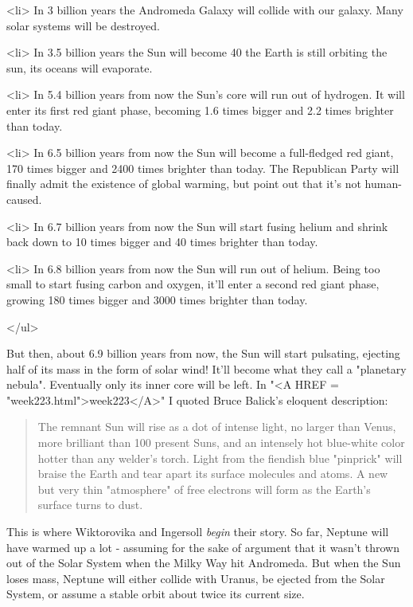 <li>
In 3 billion years the Andromeda Galaxy will collide with our galaxy.
Many solar systems will be destroyed.  

<li>
In 3.5 billion years the Sun will become 40%
the Earth is still orbiting the sun, its oceans will evaporate.

<li>
In 5.4 billion years from now the Sun's core will run out of hydrogen.
It will enter its first red giant phase, becoming 1.6 times bigger and 
2.2 times brighter than today.

<li>
In 6.5 billion years from now the Sun will become a full-fledged red 
giant, 170 times bigger and 2400 times brighter than today.  The 
Republican Party will finally admit the existence of global warming, 
but point out that it's not human-caused.

<li>
In 6.7 billion years from now the Sun will start fusing helium and 
shrink back down to 10 times bigger and 40 times brighter than today.

<li>
In 6.8 billion years from now the Sun will run out of helium.  Being
too small to start fusing carbon and oxygen, it'll enter a second red 
giant phase, growing 180 times bigger and 3000 times brighter than today. 

</ul>

But then, about 6.9 billion years from now, the Sun will start pulsating, 
ejecting half of its mass in the form of solar wind!  It'll become what
they call a "planetary nebula".  Eventually only its inner core will be 
left.  In "<A HREF = "week223.html">week223</A>" I quoted Bruce Balick's eloquent description: 

\begin{quote}
     The remnant Sun will rise as a dot of intense light, no larger
     than Venus, more brilliant than 100 present Suns, and an
     intensely hot blue-white color hotter than any welder's torch.
     Light from the fiendish blue "pinprick" will braise the
     Earth and tear apart its surface molecules and atoms.  A new but
     very thin "atmosphere" of free electrons will form as
     the Earth's surface turns to dust.  
\end{quote}

This is where Wiktorovika and Ingersoll \emph{begin} their story.  So far, 
Neptune will have warmed up a lot - assuming for the sake of argument 
that it wasn't thrown out of the Solar System when the Milky Way hit
Andromeda.  But when the Sun loses mass, Neptune will either collide 
with Uranus, be ejected from the Solar System, or assume a stable orbit 
about twice its current size.  

